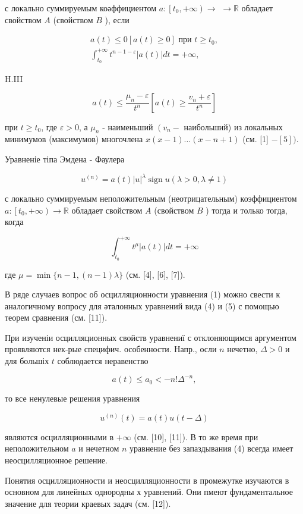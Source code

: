 \documentclass[10pt]{article}
\begin{document}
с локально суммируемым коәффициентом $a:\left[t_{0},+\infty\right) \rightarrow$ $\rightarrow \mathbb{R}$ обладает свойством $A$ (свойством $B$ ), если

\[
\begin{gathered}
a(t) \leqslant 0[a(t) \geqslant 0] \text { при } t \geqslant t_{0}, \\
\int_{t_{0}}^{+\infty} t^{n-1-\varepsilon}|a(t)| d t=+\infty,
\end{gathered}
\]

H.III

\[
a(t) \leqslant \frac{\mu_{n}-\varepsilon}{t^{n}}\left[a(t) \geqslant \frac{v_{n}+\varepsilon}{t^{n}}\right]
\]

при $t \geqslant t_{0}$, где $\varepsilon>0$, а $\mu_{n}$ - наименьший $\left(v_{n}-\right.$ наибольший) из локальных минимумов (максимумов) многочлена $x(x-1) \ldots(x-n+1)$ (см. [1] $-[5])$.

Уравненіе тіпа Эмдена - Фаулера

\[
u^{(n)}=a(t)|u|^{\lambda} \operatorname{sign} u(\lambda>0, \lambda \neq 1)
\]

с локально суммируемым неположительным (неотрицательным) коэффициентом $a:\left[t_{0},+\infty\right) \rightarrow \mathbb{R}$ обладает свойством $A$ (свойством $B$ ) тогда и только тогда, когда

\[
\int_{t_{0}}^{+\infty} t^{\mu}|a(t)| d t=+\infty
\]

где $\mu=\min \{n-1,(n-1) \lambda\}$ (см. [4], [6], [7]).

В ряде случаев вопрос об осцилляционности уравнения (1) можно свести к аналогичному вопросу для әталонных уравнений вида (4) и (5) с помощью теорем сравнения (см. [11]).

При изученіи осцилляционных свойств уравнениї с отклоняющимся аргументом проявляются нек-рые специфич. особенности. Напр., осли $n$ нечетно, $\Delta>0$ и для большіх $t$ соблюдается неравенство

\[
a(t) \leqslant a_{0}<-n ! \Delta^{-n},
\]

то все ненулевые решения уравнения

\[
u^{(n)}(t)=a(t) u(t-\Delta)
\]

являются осцилляционными в $+\infty$ (см. [10], [11]). В то же время при неположительном $a$ и нечетном $n$ уравнение без запаздывания (4) всегда имеет неосцилляционное решение.

Понятия осцилляционности и неосцилляционности в промежутке изучаются в основном для линейных однородны х уравнений. Они пмеют фундаментальное значение для теории краевых задач (см. [12]).
\end{document}
